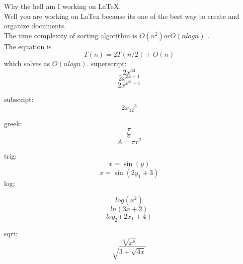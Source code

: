 \documentclass[11pt]{article}
\begin{document}
Why the hell am I working on LaTeX.\\
Well you are working on LaTex because its one of the best way to create and organize documents.\\
The time complexity  of sorting algorithm is $O(n^2) or O(nlogn)$ .\\
The equation is $$T(n)=2T(n/2)+O(n)$$
which solves as $O(nlogn)$.
superscript:
$$2x^{34}$$
$$2x^{3x+1}$$
$$2x^{x^{21}+1}$$

subscript:
$$2{x_{12}}^3$$

greek:
$$\pi$$
$$\omega$$
$$\sigma$$
$$A=\pi r^2$$

trig:
$$x=\sin(y)$$
$$x=\sin(2y_1+3)$$
log:

$$log(x^2)$$
$$ln(3x+2)$$
$$log_2(2x_1+4)$$

sqrt:
$$\sqrt[4]{x^8}$$
$$\sqrt{3+\sqrt{4x}}$$
\end{document}
